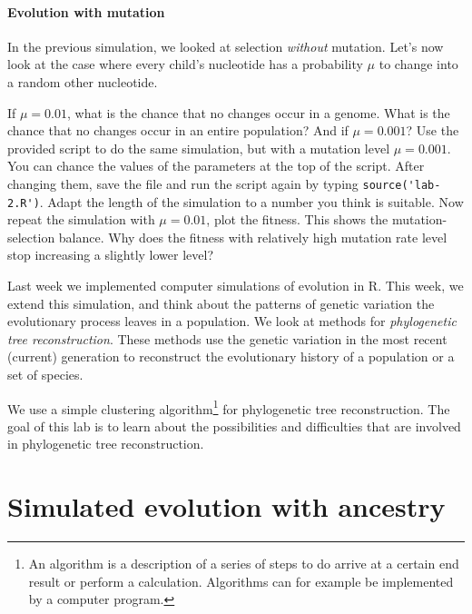 \documentclass[a4paper, 9pt]{article}
\begin{document}
\paragraph{Evolution with mutation}

In the previous simulation, we looked at selection \textit{without}
mutation. Let's now look at the case where every child's nucleotide has
a probability $\mu$ to change into a random other nucleotide.

\begin{exercise}
    \action If $\mu=0.01$, what is the chance that no changes occur in a genome. What is the chance that no changes occur in an entire population? And if $\mu=0.001$?
    \action Use the provided script to do the same simulation, but with a mutation level $\mu=0.001$. You can chance the values of the parameters at the top of the script. After changing them, save the file and run the script again by typing \verb|source('lab-2.R')|. Adapt the length of the simulation to a number you think is suitable.
    \action Now repeat the simulation with $\mu=0.01$, plot the fitness. This shows the mutation-selection balance.
    \askstar Why does the fitness with relatively high mutation rate level stop increasing a slightly lower level?
\end{exercise}


\begin{goals}
Last week we implemented computer simulations of evolution in R. This
week, we extend this simulation, and think about the patterns of genetic
variation the evolutionary process leaves in a population. We look at
methods for \emph{phylogenetic tree reconstruction}. These methods use
the genetic variation in the most recent (current) generation to
reconstruct the evolutionary history of a population or a set of
species.

We use a simple clustering
algorithm\footnote{An algorithm is a description of a series of steps to do arrive at a certain end result or perform a calculation. Algorithms can for example be implemented by a computer program.}
for phylogenetic tree reconstruction. The goal of this lab is to learn
about the possibilities and difficulties that are involved in
phylogenetic tree reconstruction.
\end{goals}

\section{Simulated evolution with ancestry}\label{simulated-evolution-continued}
\end{document}
